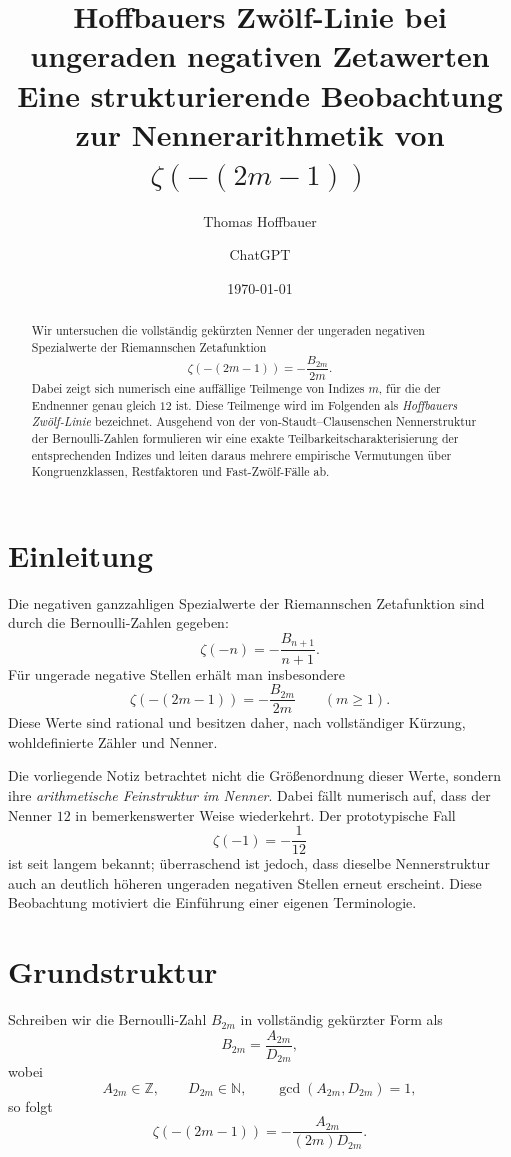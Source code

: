\documentclass[11pt,a4paper]{article}
\title{\textbf{Hoffbauers Zwölf-Linie bei ungeraden negativen Zetawerten}\\
	\large Eine strukturierende Beobachtung zur Nennerarithmetik von $\zeta(-(2m-1))$}
\author{Thomas Hoffbauer \and ChatGPT}
\date{\today}
\theoremstyle{definition}
\theoremstyle{plain}
\theoremstyle{remark}
\begin{document}
	\maketitle
	
	\begin{abstract}
		Wir untersuchen die vollständig gekürzten Nenner der ungeraden negativen Spezialwerte der Riemannschen Zetafunktion
		\[
		\zeta(-(2m-1))=-\frac{B_{2m}}{2m}.
		\]
		Dabei zeigt sich numerisch eine auffällige Teilmenge von Indizes $m$, für die der Endnenner genau gleich $12$ ist. Diese Teilmenge wird im Folgenden als \emph{Hoffbauers Zwölf-Linie} bezeichnet. Ausgehend von der von-Staudt--Clausenschen Nennerstruktur der Bernoulli-Zahlen formulieren wir eine exakte Teilbarkeitscharakterisierung der entsprechenden Indizes und leiten daraus mehrere empirische Vermutungen über Kongruenzklassen, Restfaktoren und Fast-Zwölf-Fälle ab.
	\end{abstract}
	
	\section{Einleitung}
	
	Die negativen ganzzahligen Spezialwerte der Riemannschen Zetafunktion sind durch die Bernoulli-Zahlen gegeben:
	\[
	\zeta(-n)=-\frac{B_{n+1}}{n+1}.
	\]
	Für ungerade negative Stellen erhält man insbesondere
	\[
	\zeta(-(2m-1))=-\frac{B_{2m}}{2m}
	\qquad (m\ge 1).
	\]
	Diese Werte sind rational und besitzen daher, nach vollständiger Kürzung, wohldefinierte Zähler und Nenner.
	
	Die vorliegende Notiz betrachtet nicht die Größenordnung dieser Werte, sondern ihre \emph{arithmetische Feinstruktur im Nenner}. Dabei fällt numerisch auf, dass der Nenner $12$ in bemerkenswerter Weise wiederkehrt. Der prototypische Fall
	\[
	\zeta(-1)=-\frac{1}{12}
	\]
	ist seit langem bekannt; überraschend ist jedoch, dass dieselbe Nennerstruktur auch an deutlich höheren ungeraden negativen Stellen erneut erscheint. Diese Beobachtung motiviert die Einführung einer eigenen Terminologie.
	
	\section{Grundstruktur}
	
	Schreiben wir die Bernoulli-Zahl $B_{2m}$ in vollständig gekürzter Form als
	\[
	B_{2m}=\frac{A_{2m}}{D_{2m}},
	\]
	wobei
	\[
	A_{2m}\in\mathbb{Z},\qquad D_{2m}\in\mathbb{N},\qquad \gcd(A_{2m},D_{2m})=1,
	\]
	so folgt
	\[
	\zeta(-(2m-1))=-\frac{A_{2m}}{(2m)D_{2m}}.
	\]
	
\end{document}
